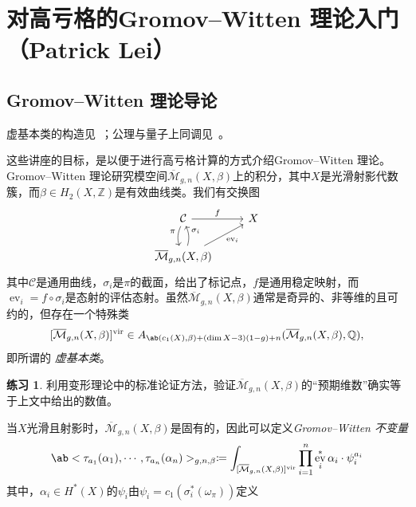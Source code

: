 \documentclass{amsart}
\theoremstyle{definition}
\newtheorem{exer}[thm]{练习}
\theoremstyle{remark}
\theoremstyle{plain}
\theoremstyle{definition}
\theoremstyle{remark}
\newcommand{\Z}{\mathbb{Z}}
\newcommand{\Q}{\mathbb{Q}}
\newcommand{\Mbar}{\overline{\mathcal{M}}}
\newcommand{\mc}[1]{\mathcal{#1}}
\newcommand{\mr}[1]{\mathrm{#1}}
\newcommand{\on}[1]{\operatorname{#1}}
\newcommand{\1}{\mathbf{1}}
\newcommand{\2}{\mathbf{2}}
\newcommand{\3}{\mathbf{3}}
\newcommand{\vir}{\mr{vir}}
\DeclareMathOperator{\ev}{ev}
\begin{document}
\section{对高亏格的Gromov--Witten 理论入门（Patrick Lei）}%
\label{sec:Intro to GW theory with a view to higher genus (Patrick Lei)}


\subsection{Gromov--Witten 理论导论}%
\label{sub:Introduction to GW theory}

虚基本类的构造见~\cite{BehrendFantechi1997}；公理与量子上同调见~\cite{KM1994}。

这些讲座的目标，是以便于进行高亏格计算的方式介绍Gromov--Witten 理论。Gromov--Witten 理论研究模空间\(\Mbar_{g,n}(X, \beta)\)上的积分，其中\(X\)是光滑射影代数簇，而\(\beta \in H_2(X, \Z)\)是有效曲线类。我们有交换图
\begin{equation*}
\begin{tikzcd}
    \mc{C} \ar{r}{f} \ar[bend right=20]{d}[swap]{\pi} & X \\
    \Mbar_{g,n}(X, \beta) \ar[bend right=20]{u}[swap]{\sigma_i} \ar{ur}[swap]{\on{ev}_i}
\end{tikzcd}
\end{equation*}
其中\(\mc{C}\)是通用曲线，\(\sigma_i\)是\(\pi\)的截面，给出了标记点，\(f\)是通用稳定映射，而\(\ev_i = f \circ \sigma_i\)是态射的评估态射。虽然\(\Mbar_{g,n}(X, \beta)\)通常是奇异的、非等维的且可约的，但存在一个特殊类
\[ [\Mbar_{g,n}(X, \beta)]^{\vir} \in A_{\ab(c_1(X), \beta) + (\dim X - 3)(1-g) + n}(\Mbar_{g,n}(X, \beta), \Q), \]
即所谓的 \textit{虚基本类}。

\begin{exer}
    利用变形理论中的标准论证方法，验证\(\Mbar_{g,n}(X, \beta)\)的“预期维数”确实等于上文中给出的数值。
\end{exer}

当\(X\)光滑且射影时，\(\Mbar_{g,n}(X, \beta)\)是固有的，因此可以定义\textit{Gromov--Witten 不变量}
\[ \ab<\tau_{a_1}(\alpha_1), \cdots, \tau_{a_n}(\alpha_n)>_{g,n,\beta} \coloneqq \int_{[\Mbar_{g,n}(X, \beta)]^{\vir}} \prod_{i=1}^n \ev_i^* \alpha_i \cdot \psi_i^{a_i} \]
其中，\(\alpha_i \in H^*(X)\)的\(\psi_i\)由\(\psi_i = c_1(\sigma_i^*(\omega_{\pi}))\)定义
\end{document}
